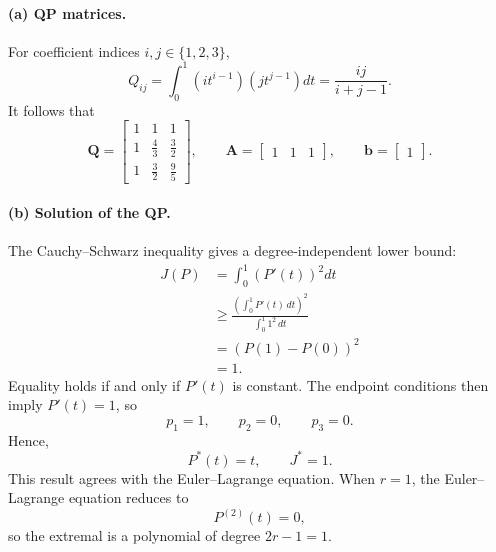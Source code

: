 \documentclass[11pt]{article}
\begin{document}
\paragraph{(a) QP matrices.}
For coefficient indices $i,j\in\{1,2,3\}$,
\begin{equation}
    Q_{ij}
    =\int_0^1
      \left(it^{i-1}\right)
      \left(jt^{j-1}\right)dt
    =\frac{ij}{i+j-1}.
\end{equation}
It follows that
\begin{equation}
    \boxed{
    \mathbf{Q}=\begin{bmatrix}
        1 & 1 & 1 \\
        1 & \frac{4}{3} & \frac{3}{2} \\
        1 & \frac{3}{2} & \frac{9}{5}
    \end{bmatrix},
    \qquad
    \mathbf{A}=\begin{bmatrix}1 & 1 & 1\end{bmatrix},
    \qquad
    \mathbf{b}=\begin{bmatrix}1\end{bmatrix}.}
\end{equation}

\paragraph{(b) Solution of the QP.}
The Cauchy--Schwarz inequality gives a degree-independent lower bound:
\begin{align}
    J(P)
    &=\int_0^1 \left(P'(t)\right)^2dt \\
    &\geq
    \frac{\left(\int_0^1 P'(t)\,dt\right)^2}
         {\int_0^1 1^2\,dt} \\
    &=\left(P(1)-P(0)\right)^2 \\
    &=1.
\end{align}
Equality holds if and only if $P'(t)$ is constant. The endpoint
conditions then imply $P'(t)=1$, so
\begin{equation}
    p_1=1, \qquad p_2=0, \qquad p_3=0.
\end{equation}
Hence,
\begin{equation}
    \boxed{P^*(t)=t, \qquad J^*=1.}
\end{equation}
This result agrees with the Euler--Lagrange equation. When $r=1$,
the Euler--Lagrange equation reduces to
\begin{equation}
    P^{(2)}(t)=0,
\end{equation}
so the extremal is a polynomial of degree $2r-1=1$.
\end{document}
